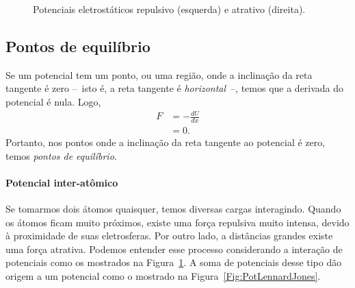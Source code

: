 \begin{figure}
\begin{minipage}[c]{0.45\linewidth}
\end{minipage}
\caption{Potenciais eletrostáticos repulsivo (esquerda) e atrativo (direita). \label{Fig:PotencialEletromagRepulsivoAtrativo}}
\end{figure}

\subsection{Pontos de equilíbrio}

Se um potencial tem um ponto, ou uma região, onde a inclinação da reta tangente é zero --~isto é, a reta tangente é \emph{horizontal}~--, temos que a derivada do potencial é nula. Logo,
\begin{align}
    F &= - \frac{dU}{dx} \\
    &= 0.
\end{align}
%
Portanto, nos pontos onde a inclinação da reta tangente ao potencial é zero, temos \emph{pontos de equilíbrio}.

\paragraph{Potencial inter-atômico}

Se tomarmos dois átomos quaisquer, temos diversas cargas interagindo. Quando os átomos ficam muito próximos, existe uma força repulsiva muito intensa, devido à proximidade de suas eletrosferas. Por outro lado, a distâncias grandes existe uma força atrativa. Podemos entender esse processo considerando a interação de potenciais como os mostrados na Figura~\ref{Fig:PotencialEletromagRepulsivoAtrativo}. A soma de potenciais desse tipo dão origem a um potencial como o mostrado na Figura~\ref{Fig:PotLennardJones}.

